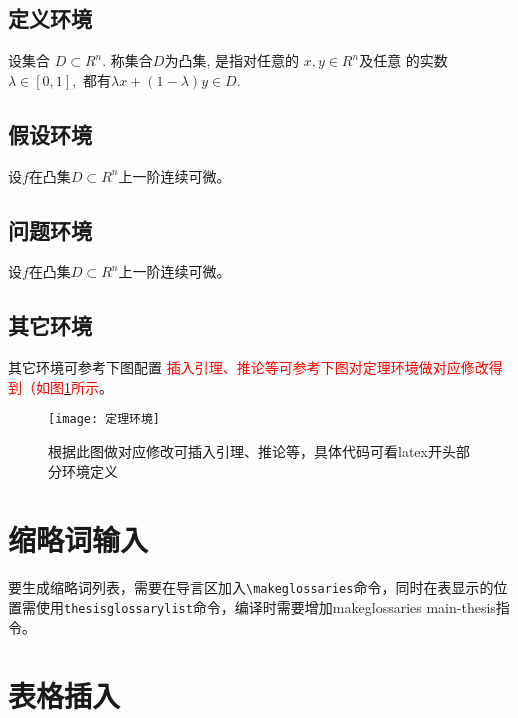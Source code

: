 \documentclass[master]{hdu-thesis}
\begin{document}
\subsection{定义环境}
\begin{definition}
设集合 $D \subset {R^n}.$ 称集合$D$为凸集, 是指对任意的 $x,y \in {R^n}$及任意
的实数$\lambda  \in [0,1],$ 都有$\lambda x + (1 - \lambda )y \in D.$
\end{definition}

\subsection{假设环境}
\begin{assumption}
设$f$在凸集$D \subset {R^n}$上一阶连续可微。
\end{assumption}
\subsection{问题环境}
\begin{problem}
  设$f$在凸集$D \subset {R^n}$上一阶连续可微。
  \end{problem}
 
\subsection{其它环境}
其它环境可参考下图配置
\textcolor{red}{插入引理、推论等可参考下图对定理环境做对应修改得到（如图\ref{fig_定理环境}所示}。
 \begin{figure}[!htb]
  \centering
  \texttt{[image: 定理环境]}
  \caption{根据此图做对应修改可插入引理、推论等，具体代码可看latex开头部分环境定义}
  \label{fig_定理环境}
\end{figure}



\section{缩略词输入}

要生成缩略词列表，需要在导言区加入\verb+\makeglossaries+命令，同时在表显示的位置需使用\verb+thesisglossarylist+命令，编译时需要增加makeglossaries main-thesis指令。



\section{表格插入}
\end{document}
